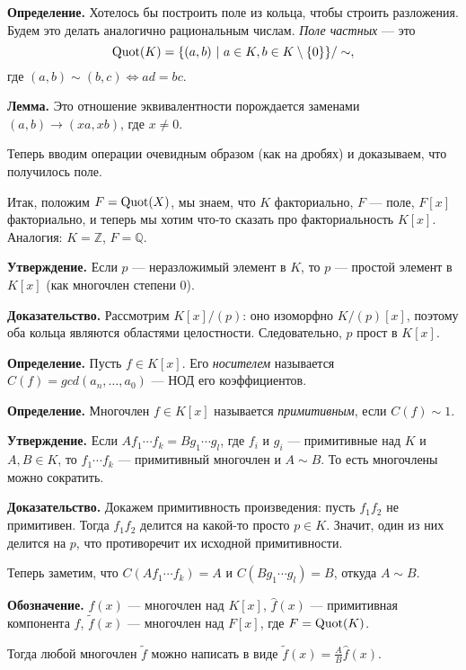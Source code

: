 \textbf{Определение.} Хотелось бы построить поле из кольца, чтобы строить разложения.
Будем это делать аналогично рациональным числам. \textit{Поле частных} --- это
\[
    \operatorname{Quot}(K) = \{(a, b)~|~a \in K, b \in K \setminus \{0\}\} / \sim,
\]
где $(a, b) \sim (b, c) \iff ad = bc$.

\textbf{Лемма.} Это отношение эквивалентности порождается заменами $(a, b) \to (xa, xb)$, где $x \ne 0$.

Теперь вводим операции очевидным образом (как на дробях) и доказываем, что получилось поле.

Итак, положим $F = \operatorname{Quot}(X)$, мы знаем, что $K$ факториально, $F$ --- поле, $F[x]$ факториально, и теперь мы хотим что-то сказать про факториальность $K[x]$.
Аналогия: $K = \mathbb Z$, $F = \mathbb Q$.

\textbf{Утверждение.} Если $p$ --- неразложимый элемент в $K$, то $p$ --- простой элемент в $K[x]$ (как многочлен степени 0).

\textbf{Доказательство.} Рассмотрим $K[x] / (p)$: оно изоморфно $K/(p)[x]$, поэтому оба кольца являются областями целостности.
Следовательно, $p$ прост в $K[x]$.

\QED

\textbf{Определение.} Пусть $f \in K[x]$. Его \textit{носителем} называется $C(f) = gcd(a_n, \dots, a_0)$ --- НОД его коэффициентов.

\textbf{Определение.} Многочлен $f \in K[x]$ называется \textit{примитивным}, если $C(f) \sim 1$.

\textbf{Утверждение.} Если $A f_1 \cdots f_k = B g_1 \cdots g_l$, где $f_i$ и $g_i$ --- примитивные над $K$ и $A, B \in K$, то $f_1 \cdots f_k$ --- примитивный многочлен и $A \sim B$.
То есть многочлены можно сократить.

\textbf{Доказательство.} Докажем примитивность произведения: пусть $f_1 f_2$ не примитивен.
Тогда $f_1 f_2$ делится на какой-то просто $p \in K$.
Значит, один из них делится на $p$, что противоречит их исходной примитивности.

Теперь заметим, что $C(Af_1 \cdots f_k) = A$ и $C(Bg_1 \cdots g_l) = B$, откуда $A \sim B$.

\QED

\textbf{Обозначение.} $f(x)$ --- многочлен над $K[x]$, $\widehat f(x)$ --- примитивная компонента $f$, $\widetilde f(x)$ --- многочлен над $F[x]$, где $F = \operatorname{Quot}(K)$.

Тогда любой многочлен $\widetilde f$ можно написать в виде $\widetilde f(x) = \frac{A}{B} \widehat f(x)$.

